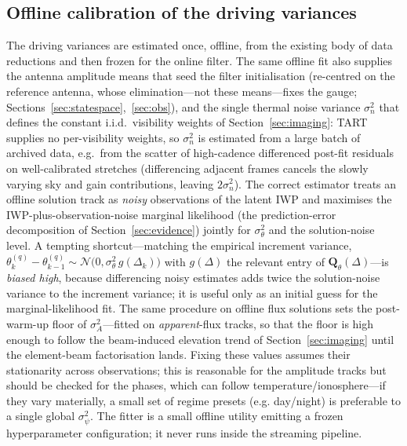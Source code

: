 \documentclass[11pt]{article}
\newcommand{\Norm}{\mathcal{N}}
\begin{document}
\subsection{Offline calibration of the driving variances}
\label{sec:hyper}

The driving variances are estimated once, offline, from the existing body of data reductions and then
frozen for the online filter. The same offline fit also supplies the antenna amplitude means that
seed the filter initialisation (re-centred on the reference antenna, whose elimination---not these
means---fixes the gauge; Sections~\ref{sec:statespace},~\ref{sec:obs}), and the single thermal noise
variance $\sigma_n^2$ that defines the constant i.i.d.\ visibility weights of
Section~\ref{sec:imaging}: TART supplies no per-visibility weights, so $\sigma_n^2$ is estimated
from a large batch of archived data, e.g.\ from the scatter of high-cadence differenced post-fit
residuals on well-calibrated stretches (differencing adjacent frames cancels the slowly varying sky
and gain contributions, leaving $2\sigma_n^2$). The
correct estimator treats an offline solution track as \emph{noisy} observations of the latent IWP and
maximises the IWP-plus-observation-noise marginal likelihood (the prediction-error decomposition of Section~\ref{sec:evidence}) jointly for $\sigma_\theta^2$ and the solution-noise level. A tempting shortcut---matching
the empirical increment variance, $\theta^{(q)}_k-\theta^{(q)}_{k-1}\sim\Norm\!\big(0,\sigma_\theta^2\,g(\Delta_k)\big)$
with $g(\Delta)$ the relevant entry of $\bm{Q}_\theta(\Delta)$---is \emph{biased high}, because
differencing noisy estimates adds twice the solution-noise variance to the increment variance; it is
useful only as an initial guess for the marginal-likelihood fit. The same procedure on offline flux
solutions sets the post-warm-up floor of $\sigma_A^2$---fitted on \emph{apparent}-flux tracks, so
that the floor is high enough to follow the beam-induced elevation trend of
Section~\ref{sec:imaging} until the element-beam factorisation lands. Fixing these values assumes their stationarity
across observations; this is reasonable for the amplitude tracks but should be checked for the phases,
which can follow temperature/ionosphere---if they vary materially, a small set of regime presets (e.g.
day/night) is preferable to a single global $\sigma_\psi^2$. The fitter is a small offline utility
emitting a frozen hyperparameter configuration; it never runs inside the streaming pipeline.
\end{document}
